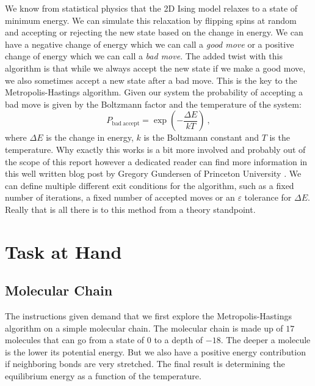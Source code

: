 \documentclass[10pt, titlepage, a4paper]{article}
\begin{document}
We know from statistical physics that the 2D Ising model relaxes to a state of minimum energy. We can simulate this 
relaxation by flipping spins at random and accepting or rejecting the new state based on the change in energy. We can have 
a negative change of energy which we can call a \textit{good move} or a positive change of energy which we can call a
\textit{bad move}. The added twist with this algorithm is that while we always accept the new state if we make a good move, we 
also sometimes accept a new state after a bad move. This is the key to the Metropolis-Hastings algorithm. Given our system the probability of
accepting a bad move is given by the Boltzmann factor and the temperature of the system:
%
\begin{equation}
    \label{eq:bad-accept-prob}
    P_{\mathrm{bad\>accept}} = \exp\left(-\frac{\Delta E}{kT}\right)\>,
\end{equation}
%
where $\Delta E$ is the change in energy, $k$ is the Boltzmann constant and $T$ is the temperature. Why exactly this works 
is a bit more involved and probably out of the scope of this report however a dedicated reader can find more information in this 
well written blog post by Gregory Gundersen of Princeton University \cite{Gundersen_2019}. We can define multiple different 
exit conditions for the algorithm, such as a fixed number of iterations, a fixed number of accepted moves or an $\varepsilon$ tolerance
for $\Delta E$. Really that is all there is to this method from a theory standpoint.\\

\section{Task at Hand}
\subsection{Molecular Chain}
The instructions given demand that we first explore the Metropolis-Hastings algorithm on a simple molecular chain. The molecular chain 
is made up of $17$ molecules that can go from a state of $0$ to a depth of $-18$. The deeper a molecule is the lower its potential energy.
But we also have a positive energy contribution if neighboring bonds are very stretched. The final result is determining the equilibrium
energy as a function of the temperature. \\ %
\end{document}
